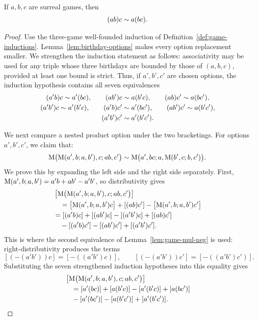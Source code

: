 \begin{theorem}
  \label{thm:game-mul-assoc}
  \leanok
  If \(a,b,c\) are surreal games, then
  \[
    (ab)c\sim a(bc).
  \]
\end{theorem}
\begin{proof}
  \leanok
  Use the three-game well-founded induction of
  Definition~\ref{def:game-inductions}.  Lemma~\ref{lem:birthday-options}
  makes every option replacement smaller.  We strengthen the induction
  statement as follows: associativity may be used for any triple whose three
  birthdays are bounded by those of \((a,b,c)\), provided at least one bound
  is strict.  Thus, if \(a',b',c'\) are chosen options, the induction
  hypothesis contains all seven equivalences
  \[
    \begin{gathered}
      (a'b)c\sim a'(bc),\qquad
      (ab')c\sim a(b'c),\qquad
      (ab)c'\sim a(bc'),\\
      (a'b')c\sim a'(b'c),\qquad
      (a'b)c'\sim a'(bc'),\qquad
      (ab')c'\sim a(b'c'),\\
      (a'b')c'\sim a'(b'c').
    \end{gathered}
  \]

  We next compare a nested product option under the two bracketings.  For
  options \(a',b',c'\), we claim that:
  \[
    \operatorname{M}\bigl(\operatorname{M}(a',b;a,b'),c;ab,c'\bigr)
      \sim
    \operatorname{M}\bigl(a',bc;a,\operatorname{M}(b',c;b,c')\bigr).
  \]
  We prove this by expanding the left side and the right side separately.
  First, \(\operatorname{M}(a',b;a,b')=a'b+ab'-a'b'\), so distributivity gives
  \[
    \begin{aligned}
      &\left[
        \operatorname{M}\bigl(\operatorname{M}(a',b;a,b'),c;ab,c'\bigr)
      \right]\\
      &\quad=
        \bigl[\operatorname{M}(a',b;a,b')c\bigr]+[(ab)c']
          -\bigl[\operatorname{M}(a',b;a,b')c'\bigr]\\
        &=[(a'b)c]+[(ab')c]-[(a'b')c]+[(ab)c']\\
        &\quad-[(a'b)c']-[(ab')c']+[(a'b')c'].
    \end{aligned}
  \]
  This is where the second equivalence of Lemma~\ref{lem:game-mul-neg} is
  used: right-distributivity produces the terms
  \[
    [(-(a'b'))c]
      =[-((a'b')c)],
    \qquad
    [(-(a'b'))c']
      =[-((a'b')c')].
  \]
  Substituting the seven strengthened induction hypotheses into this equality
  gives
  \[
    \begin{aligned}
      &\left[
        \operatorname{M}\bigl(\operatorname{M}(a',b;a,b'),c;ab,c'\bigr)
      \right]\\
        &\quad=[a'(bc)]+[a(b'c)]-[a'(b'c)]+[a(bc')]\\
        &\quad-[a'(bc')]-[a(b'c')]+[a'(b'c')].
    \end{aligned}
  \]


\end{proof}
